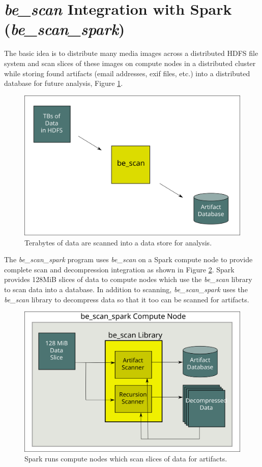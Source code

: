 \documentclass[12pt,twoside]{article}
\newcommand{\bes}{\emph{be\_scan}\xspace}
\newcommand{\bess}{\emph{be\_scan\_spark}\xspace}
\begin{document}
\section{\bes Integration with Spark (\bess)}
The basic idea is to distribute many media images across a distributed HDFS file system and scan slices of these images on compute nodes in a distributed cluster while storing found artifacts (email addresses, exif files, etc.) into a distributed database for future analysis, Figure \ref{fig:sparkScan}.

\begin{figure}
	\center
	\includegraphics[scale=.45]{spark_scan}
	\caption{Terabytes of data are scanned into a data store for analysis.}
	\label{fig:sparkScan}
\end{figure}

The \bess program uses \bes on a Spark compute node to provide complete scan and decompression integration as shown in Figure \ref{fig:sparkBEScan}.  Spark provides 128MiB slices of data to compute nodes which use the \bes library to scan data into a database.  In addition to scanning, \bess uses the \bes library to decompress data so that it too can be scanned for artifacts.

\begin{figure}
	\center
	\includegraphics[scale=.45]{spark_be_scan}
	\caption{Spark runs compute nodes which scan slices of data for artifacts.}
	\label{fig:sparkBEScan}
\end{figure}
\end{document}
